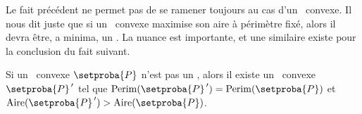\begin{remark}
	Le fait précédent ne permet pas de se ramener toujours au cas d'un \nequi\ convexe. Il nous dit juste que si un \ngone\ convexe maximise son aire à périmètre fixé, alors il devra être, a minima, un \nequi. La nuance est importante, et une similaire existe pour la conclusion du fait suivant.
\end{remark}




\begin{fact} \label{almost-reg-poly}
	Si un \nequi\ convexe $\setproba{P}$ n'est pas un \niso,
	alors il existe un \ngone\ convexe $\setproba{P}^{\,\prime}$ tel que
	$\perim{\setproba{P}^{\,\prime}} = \perim{\setproba{P}}$
	et
	$\area{\setproba{P}^{\,\prime}} > \area{\setproba{P}}$.
\end{fact}


